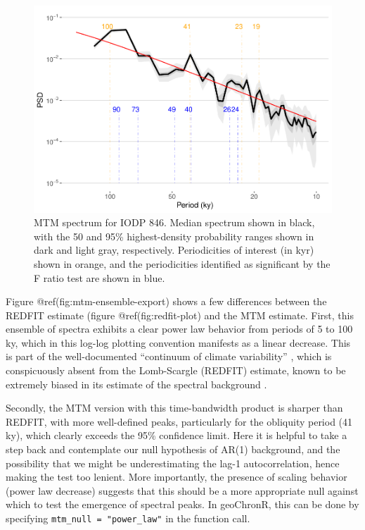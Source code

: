 \documentclass[gchron, manuscript]{copernicus}
\begin{document}
\begin{figure}
\includegraphics[width=12cm]{geoChronR-paper_files/figure-latex/mtm-ensemble-export-1} \caption{MTM spectrum for IODP 846. Median spectrum shown in black, with the 50 and 95\% highest-density probability ranges shown in dark and light gray, respectively. Periodicities of interest (in kyr) shown in orange, and the periodicities identified as significant by the F ratio test are shown in blue.}\label{fig:mtm-ensemble-export}
\end{figure}

Figure @ref(fig:mtm-ensemble-export) shows a few differences between the
REDFIT estimate (figure @ref(fig:redfit-plot) and the MTM estimate.
First, this ensemble of spectra exhibits a clear power law behavior from
periods of 5 to 100 ky, which in this log-log plotting convention
manifests as a linear decrease. This is part of the well-documented
``continuum of climate variability''
\citep{Huybers_Curry2006, ZhuPNAS2019}, which is conspicuously absent
from the Lomb-Scargle (REDFIT) estimate, known to be extremely biased in
its estimate of the spectral background \citep{schulz2002}.

Secondly, the MTM version with this time-bandwidth product is sharper
than REDFIT, with more well-defined peaks, particularly for the
obliquity period (41 ky), which clearly exceeds the 95\% confidence
limit. Here it is helpful to take a step back and contemplate our null
hypothesis of AR(1) background, and the possibility that we might be
underestimating the lag-1 autocorrelation, hence making the test too
lenient. More importantly, the presence of scaling behavior (power law
decrease) suggests that this should be a more appropriate null against
which to test the emergence of spectral peaks. In geoChronR, this can be
done by specifying \texttt{mtm\_null\ =\ "power\_law"} in the function
call.
\end{document}
